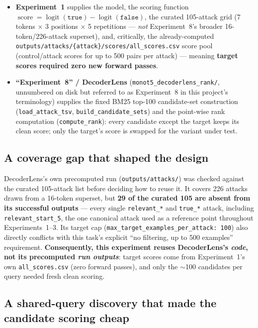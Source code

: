 \documentclass[11pt]{article}
\newcommand{\score}{\operatorname{score}}
\begin{document}
\begin{itemize}[nosep]
  \item \textbf{Experiment~1} supplies the model, the scoring function
        $\score=\operatorname{logit}(\texttt{true})-\operatorname{logit}(\texttt{false})$,
        the curated 105-attack grid (7 tokens $\times$ 3 positions $\times$
        5 repetitions --- \emph{not} Experiment~8's broader 16-token/226-attack
        superset), and, critically, the already-computed
        \texttt{outputs/attacks/\{attack\}/scores/all\_scores.csv} score
        pool (control/attack scores for up to 500 pairs per attack) ---
        meaning \textbf{target scores required zero new forward passes}.
  \item \textbf{``Experiment~8'' / DecoderLens}
        (\texttt{monot5\_decoderlens\_rank/}, unnumbered on disk but
        referred to as Experiment~8 in this project's terminology) supplies
        the fixed BM25 top-100 candidate-set construction
        (\texttt{load\_attack\_tsv}, \texttt{build\_candidate\_sets}) and
        the point-wise rank computation (\texttt{compute\_rank}): every
        candidate except the target keeps its clean score; only the
        target's score is swapped for the variant under test.
\end{itemize}

\subsection{A coverage gap that shaped the design}
\label{sec:coverage}

DecoderLens's own precomputed run (\texttt{outputs/attacks/}) was checked
against the curated 105-attack list before deciding how to reuse it. It
covers 226 attacks drawn from a 16-token superset, but \textbf{29 of the
curated 105 are absent from its successful outputs} --- every single
\texttt{relevant\_*} and \texttt{true\_*} attack, including
\texttt{relevant\_start\_5}, the one canonical attack used as a reference
point throughout Experiments~1--3. Its target cap
(\texttt{max\_target\_examples\_per\_attack: 100}) also directly conflicts
with this task's explicit ``no filtering, up to 500 examples'' requirement.
\textbf{Consequently, this experiment reuses DecoderLens's \emph{code}, not
its precomputed \emph{run outputs}}: target scores come from Experiment~1's
own \texttt{all\_scores.csv} (zero forward passes), and only the $\sim$100
candidates per query needed fresh clean scoring.

\subsection{A shared-query discovery that made the candidate scoring cheap}
\end{document}
